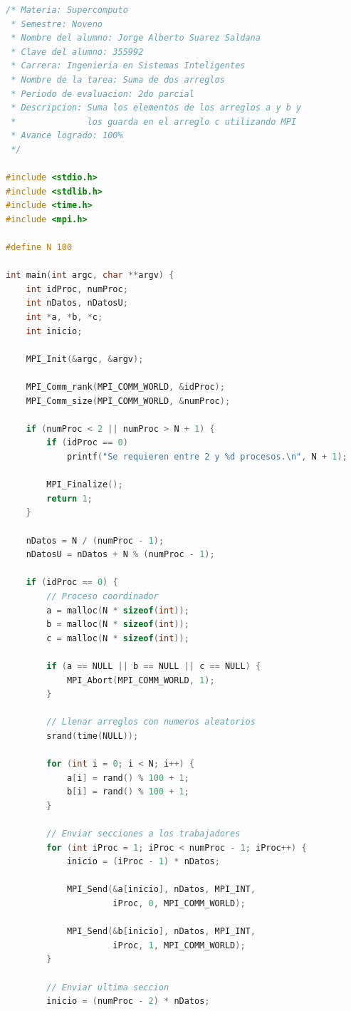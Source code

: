 \documentclass[12pt,a4paper]{article}
\begin{document}
\begin{lstlisting}[language=C]
/* Materia: Supercomputo
 * Semestre: Noveno
 * Nombre del alumno: Jorge Alberto Suarez Saldana
 * Clave del alumno: 355992
 * Carrera: Ingenieria en Sistemas Inteligentes
 * Nombre de la tarea: Suma de dos arreglos
 * Periodo de evaluacion: 2do parcial
 * Descripcion: Suma los elementos de los arreglos a y b y
 *              los guarda en el arreglo c utilizando MPI
 * Avance logrado: 100%
 */

#include <stdio.h>
#include <stdlib.h>
#include <time.h>
#include <mpi.h>

#define N 100

int main(int argc, char **argv) {
    int idProc, numProc;
    int nDatos, nDatosU;
    int *a, *b, *c;
    int inicio;

    MPI_Init(&argc, &argv);

    MPI_Comm_rank(MPI_COMM_WORLD, &idProc);
    MPI_Comm_size(MPI_COMM_WORLD, &numProc);

    if (numProc < 2 || numProc > N + 1) {
        if (idProc == 0)
            printf("Se requieren entre 2 y %d procesos.\n", N + 1);

        MPI_Finalize();
        return 1;
    }

    nDatos = N / (numProc - 1);
    nDatosU = nDatos + N % (numProc - 1);

    if (idProc == 0) {
        // Proceso coordinador
        a = malloc(N * sizeof(int));
        b = malloc(N * sizeof(int));
        c = malloc(N * sizeof(int));

        if (a == NULL || b == NULL || c == NULL) {
            MPI_Abort(MPI_COMM_WORLD, 1);
        }

        // Llenar arreglos con numeros aleatorios
        srand(time(NULL));

        for (int i = 0; i < N; i++) {
            a[i] = rand() % 100 + 1;
            b[i] = rand() % 100 + 1;
        }

        // Enviar secciones a los trabajadores
        for (int iProc = 1; iProc < numProc - 1; iProc++) {
            inicio = (iProc - 1) * nDatos;

            MPI_Send(&a[inicio], nDatos, MPI_INT,
                     iProc, 0, MPI_COMM_WORLD);

            MPI_Send(&b[inicio], nDatos, MPI_INT,
                     iProc, 1, MPI_COMM_WORLD);
        }

        // Enviar ultima seccion
        inicio = (numProc - 2) * nDatos;


\end{lstlisting}
\end{document}
